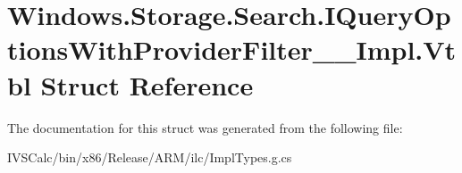 \hypertarget{struct_windows_1_1_storage_1_1_search_1_1_i_query_options_with_provider_filter_____impl_1_1_vtbl}{}\section{Windows.\+Storage.\+Search.\+I\+Query\+Options\+With\+Provider\+Filter\+\_\+\+\_\+\+Impl.\+Vtbl Struct Reference}
\label{struct_windows_1_1_storage_1_1_search_1_1_i_query_options_with_provider_filter_____impl_1_1_vtbl}


The documentation for this struct was generated from the following file\+:\begin{DoxyCompactItemize}
\item 
I\+V\+S\+Calc/bin/x86/\+Release/\+A\+R\+M/ilc/Impl\+Types.\+g.\+cs\end{DoxyCompactItemize}
